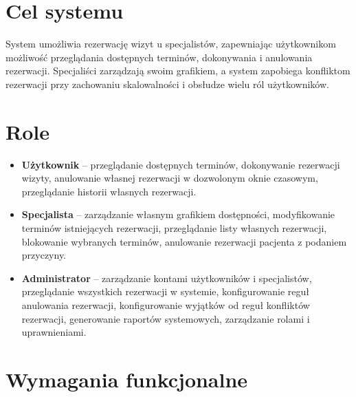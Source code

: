 \documentclass[12pt,a4paper]{article}
\begin{document}
\section{Cel systemu}

System umożliwia rezerwację wizyt u specjalistów, zapewniając użytkownikom możliwość przeglądania dostępnych terminów, dokonywania i anulowania rezerwacji. Specjaliści zarządzają swoim grafikiem, a system zapobiega konfliktom rezerwacji przy zachowaniu skalowalności i obsłudze wielu ról użytkowników.

\section{Role}

\begin{itemize}[leftmargin=1.5em]
  \item \textbf{Użytkownik} -- przeglądanie dostępnych terminów, dokonywanie rezerwacji wizyty, anulowanie własnej rezerwacji w dozwolonym oknie czasowym, przeglądanie historii własnych rezerwacji.
  \item \textbf{Specjalista} -- zarządzanie własnym grafikiem dostępności, modyfikowanie terminów istniejących rezerwacji, przeglądanie listy własnych rezerwacji, blokowanie wybranych terminów, anulowanie rezerwacji pacjenta z podaniem przyczyny.
  \item \textbf{Administrator} -- zarządzanie kontami użytkowników i specjalistów, przeglądanie wszystkich rezerwacji w systemie, konfigurowanie reguł anulowania rezerwacji, konfigurowanie wyjątków od reguł konfliktów rezerwacji, generowanie raportów systemowych, zarządzanie rolami i uprawnieniami.
\end{itemize}

\section{Wymagania funkcjonalne}
\end{document}

